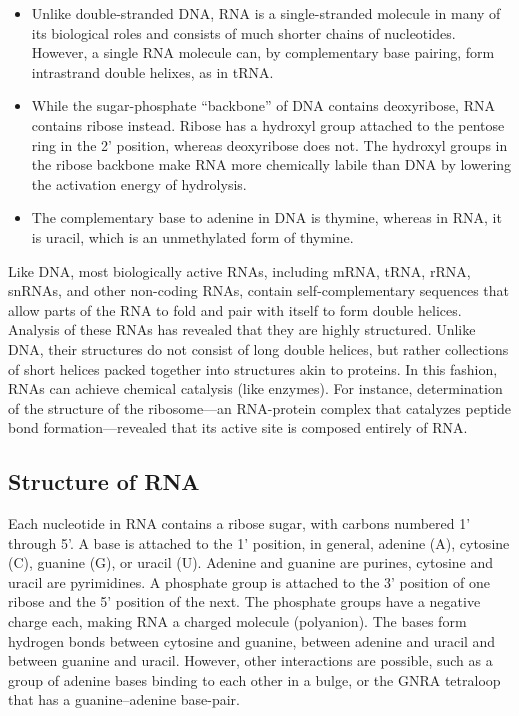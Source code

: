 \begin{itemize}
\tightlist
\item
  Unlike double-stranded DNA, RNA is a single-stranded molecule in many of its biological roles and consists of much shorter chains of nucleotides. However, a single RNA molecule can, by complementary base pairing, form intrastrand double helixes, as in tRNA.
\item
  While the sugar-phosphate ``backbone'' of DNA contains deoxyribose, RNA contains ribose instead. Ribose has a hydroxyl group attached to the pentose ring in the 2' position, whereas deoxyribose does not. The hydroxyl groups in the ribose backbone make RNA more chemically labile than DNA by lowering the activation energy of hydrolysis.
\item
  The complementary base to adenine in DNA is thymine, whereas in RNA, it is uracil, which is an unmethylated form of thymine.
\end{itemize}

Like DNA, most biologically active RNAs, including mRNA, tRNA, rRNA, snRNAs, and other non-coding RNAs, contain self-complementary sequences that allow parts of the RNA to fold and pair with itself to form double helices. Analysis of these RNAs has revealed that they are highly structured. Unlike DNA, their structures do not consist of long double helices, but rather collections of short helices packed together into structures akin to proteins. In this fashion, RNAs can achieve chemical catalysis (like enzymes). For instance, determination of the structure of the ribosome---an RNA-protein complex that catalyzes peptide bond formation---revealed that its active site is composed entirely of RNA.

\hypertarget{structure-of-rna}{%
\subsection{Structure of RNA}\label{structure-of-rna}}

Each nucleotide in RNA contains a ribose sugar, with carbons numbered 1' through 5'. A base is attached to the 1' position, in general, adenine (A), cytosine (C), guanine (G), or uracil (U). Adenine and guanine are purines, cytosine and uracil are pyrimidines. A phosphate group is attached to the 3' position of one ribose and the 5' position of the next. The phosphate groups have a negative charge each, making RNA a charged molecule (polyanion). The bases form hydrogen bonds between cytosine and guanine, between adenine and uracil and between guanine and uracil. However, other interactions are possible, such as a group of adenine bases binding to each other in a bulge, or the GNRA tetraloop that has a guanine--adenine base-pair.

